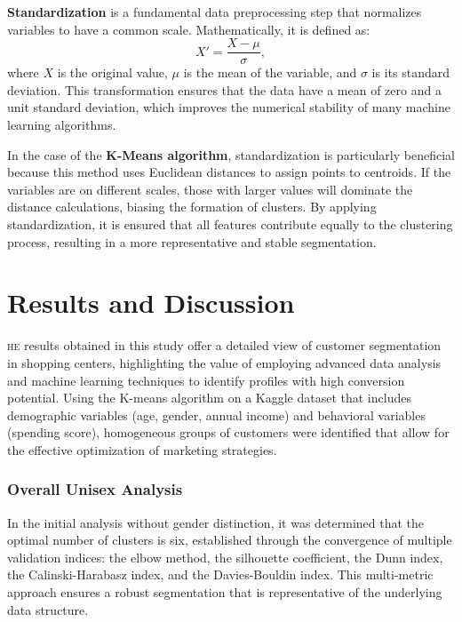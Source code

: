 \documentclass[10pt]{article}
\newcommand*\initfamily{\usefont{U}{GoudyIn}{xl}{n}}
\begin{document}
\textbf{Standardization} is a fundamental data preprocessing step that normalizes variables to have a common scale. Mathematically, it is defined as:
\begin{equation}
X' = \frac{X - \mu}{\sigma},
\end{equation}
where \( X \) is the original value, \( \mu \) is the mean of the variable, and \( \sigma \) is its standard deviation. This transformation ensures that the data have a mean of zero and a unit standard deviation, which improves the numerical stability of many machine learning algorithms.

In the case of the \textbf{K-Means algorithm}, standardization is particularly beneficial because this method uses Euclidean distances to assign points to centroids. If the variables are on different scales, those with larger values will dominate the distance calculations, biasing the formation of clusters. By applying standardization, it is ensured that all features contribute equally to the clustering process, resulting in a more representative and stable segmentation.


\section{Results and Discussion}

\lettrine[lines=3, loversize=0.01, lhang=0.01]{\scalebox{0.9}{\initfamily T}}{he} results obtained in this study offer a detailed view of customer segmentation in shopping centers, highlighting the value of employing advanced data analysis and machine learning techniques to identify profiles with high conversion potential. Using the K-means algorithm on a Kaggle dataset that includes demographic variables (age, gender, annual income) and behavioral variables (spending score), homogeneous groups of customers were identified that allow for the effective optimization of marketing strategies.

\subsubsection*{Overall Unisex Analysis}

In the initial analysis without gender distinction, it was determined that the optimal number of clusters is six, established through the convergence of multiple validation indices: the elbow method, the silhouette coefficient, the Dunn index, the Calinski-Harabasz index, and the Davies-Bouldin index. This multi-metric approach ensures a robust segmentation that is representative of the underlying data structure.
\end{document}

